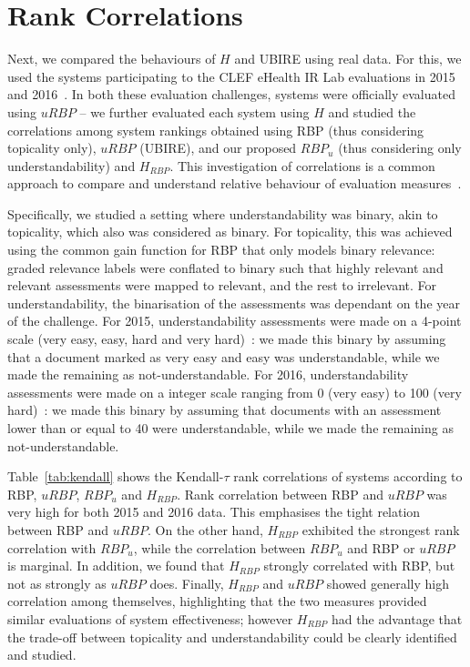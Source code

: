 



\section{Rank Correlations} %
\label{sec:clef}
Next, we compared the behaviours of $H$ and UBIRE using real data. For this, we used the systems participating to the CLEF eHealth IR Lab evaluations in 2015 and 2016~\cite{clefIR15,clefIR16}. In both these evaluation challenges, systems were officially evaluated using $uRBP$ -- we further evaluated each system using $H$ and studied the correlations among system rankings obtained using RBP (thus considering topicality only), $uRBP$ (UBIRE), and our proposed $RBP_u$ (thus considering only understandability) and $H_{RBP}$. This investigation of correlations is a common approach to compare and understand relative behaviour of evaluation measures~\cite{zuccon16}. 

Specifically, we studied a setting where understandability was binary, akin to topicality, which also was considered as binary. For topicality, this was achieved using the common gain function for RBP that only models binary relevance: graded relevance labels were conflated to binary such that highly relevant and relevant assessments were mapped to relevant, and the rest to irrelevant. For understandability, the binarisation of the assessments was dependant on the year of the challenge. For 2015, understandability assessments were made on a 4-point scale (very easy, easy, hard and very hard)~\cite{clefIR15}: we made this binary by assuming that a document marked as very easy and easy was understandable, while we made the remaining as not-understandable. For 2016, understandability assessments were made on a integer scale ranging from 0 (very easy) to 100 (very hard)~\cite{clefIR16}: we made this binary by assuming that documents with an assessment lower than or equal to 40 were understandable, while we made the remaining as not-understandable. 

Table~\ref{tab:kendall} shows the Kendall-$\tau$ rank correlations of systems according to RBP, $uRBP$, $RBP_u$ and $H_{RBP}$. Rank correlation between RBP and $uRBP$ was very high for both 2015 and 2016 data. This emphasises the tight relation between RBP and $uRBP$. On the other hand, $H_{RBP}$ exhibited the strongest rank correlation with $RBP_u$, while the correlation between $RBP_u$ and RBP or $uRBP$ is marginal. In addition, we found that $H_{RBP}$ strongly correlated with RBP, but not as strongly as  $uRBP$ does. Finally, $H_{RBP}$ and $uRBP$ showed generally high correlation among themselves, highlighting that the two measures provided similar evaluations of system effectiveness; however $H_{RBP}$ had the advantage that the trade-off between topicality and understandability could be clearly identified and studied. 

